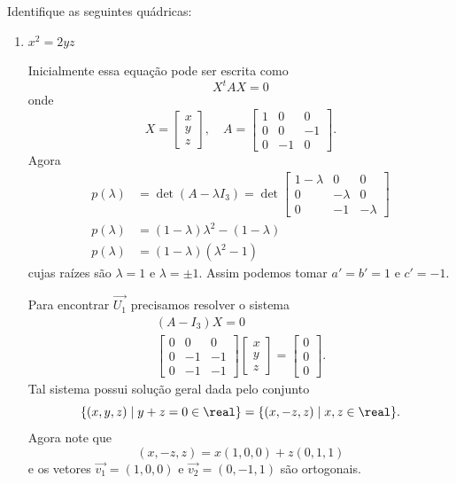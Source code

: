 \begin{exemplos}
	Identifique as seguintes quádricas:
	\begin{enumerate}
		\item $x^2 = 2yz$
		\begin{solucao}
			Inicialmente essa equação pode ser escrita como
			\[
				X^tAX = 0
			\]
			onde
			\[
				X = \begin{bmatrix}
					x\\ y\\ z
				\end{bmatrix},\quad A = \begin{bmatrix}
					1 & 0 & 0\\
					0 & 0 & -1\\
					0 & -1 & 0
				\end{bmatrix}.
			\]
			Agora
			\begin{align*}
				p(\lambda) &= \det(A - \lambda I_3) = \det \begin{bmatrix}
					1 - \lambda & 0 & 0\\
					0 & -\lambda & 0\\
					0 & -1 & -\lambda
				\end{bmatrix}\\
				p(\lambda) &= (1 - \lambda)\lambda^2 - (1 - \lambda)\\
				p(\lambda) &= (1 - \lambda)(\lambda^2 - 1)
			\end{align*}
			cujas raízes são $\lambda = 1$ e $\lambda = \pm 1$. Assim podemos tomar $a' = b' = 1$ e $c' = -1$.

			Para encontrar $\vec{U_1}$ precisamos resolver o sistema
			\begin{align*}
				(A - I_3)X = 0\\
				\begin{bmatrix}
					0 & 0 & 0\\
					0 & -1 & -1\\
					0 & -1 & -1
				\end{bmatrix} \begin{bmatrix}
					x\\ y\\ z
				\end{bmatrix} = \begin{bmatrix}
					0 \\ 0\\ 0
				\end{bmatrix}.
			\end{align*}
			Tal sistema possui solução geral dada pelo conjunto
			\[
				\{(x, y, z) \mid y + z = 0 \in \real\} = \{(x, -z, z) \mid x, z \in \real\}.
			\]
			Agora note que
			\[
				(x, -z, z) = x(1, 0, 0) + z(0, 1, 1)
			\]
			e os vetores $\vec{v_1} = (1,0,0)$ e $\vec{v_2} = (0,-1,1)$ são ortogonais.


\end{solucao}
\end{enumerate}
\end{exemplos}

